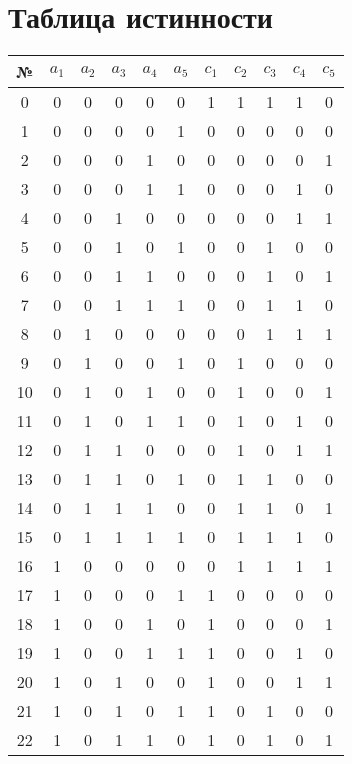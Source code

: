 \documentclass{article}
\begin{document}
\section*{Таблица истинности}
\begin{center}\begin{tabular}{|c|ccccc|ccccc|}
    \hline № & $a_1$ & $a_2$ & $a_3$ & $a_4$ & $a_5$ & $c_1$ & $c_2$ & $c_3$ & $c_4$ & $c_5$ \\ \hline
    0 & 0 & 0 & 0 & 0 & 0 & 1 & 1 & 1 & 1 & 0 \\ \hline
    1 & 0 & 0 & 0 & 0 & 1 & 0 & 0 & 0 & 0 & 0 \\ \hline
    2 & 0 & 0 & 0 & 1 & 0 & 0 & 0 & 0 & 0 & 1 \\ \hline
    3 & 0 & 0 & 0 & 1 & 1 & 0 & 0 & 0 & 1 & 0 \\ \hline
    4 & 0 & 0 & 1 & 0 & 0 & 0 & 0 & 0 & 1 & 1 \\ \hline
    5 & 0 & 0 & 1 & 0 & 1 & 0 & 0 & 1 & 0 & 0 \\ \hline
    6 & 0 & 0 & 1 & 1 & 0 & 0 & 0 & 1 & 0 & 1 \\ \hline
    7 & 0 & 0 & 1 & 1 & 1 & 0 & 0 & 1 & 1 & 0 \\ \hline
    8 & 0 & 1 & 0 & 0 & 0 & 0 & 0 & 1 & 1 & 1 \\ \hline
    9 & 0 & 1 & 0 & 0 & 1 & 0 & 1 & 0 & 0 & 0 \\ \hline
    10 & 0 & 1 & 0 & 1 & 0 & 0 & 1 & 0 & 0 & 1 \\ \hline
    11 & 0 & 1 & 0 & 1 & 1 & 0 & 1 & 0 & 1 & 0 \\ \hline
    12 & 0 & 1 & 1 & 0 & 0 & 0 & 1 & 0 & 1 & 1 \\ \hline
    13 & 0 & 1 & 1 & 0 & 1 & 0 & 1 & 1 & 0 & 0 \\ \hline
    14 & 0 & 1 & 1 & 1 & 0 & 0 & 1 & 1 & 0 & 1 \\ \hline
    15 & 0 & 1 & 1 & 1 & 1 & 0 & 1 & 1 & 1 & 0 \\ \hline
    16 & 1 & 0 & 0 & 0 & 0 & 0 & 1 & 1 & 1 & 1 \\ \hline
    17 & 1 & 0 & 0 & 0 & 1 & 1 & 0 & 0 & 0 & 0 \\ \hline
    18 & 1 & 0 & 0 & 1 & 0 & 1 & 0 & 0 & 0 & 1 \\ \hline
    19 & 1 & 0 & 0 & 1 & 1 & 1 & 0 & 0 & 1 & 0 \\ \hline
    20 & 1 & 0 & 1 & 0 & 0 & 1 & 0 & 0 & 1 & 1 \\ \hline
    21 & 1 & 0 & 1 & 0 & 1 & 1 & 0 & 1 & 0 & 0 \\ \hline
    22 & 1 & 0 & 1 & 1 & 0 & 1 & 0 & 1 & 0 & 1 \\ \hline

\end{tabular}
\end{center}
\end{document}
